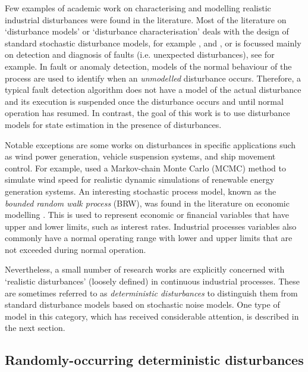 Few examples of academic work on characterising and modelling realistic industrial disturbances were found in the literature. Most of the literature on `disturbance models' or `disturbance characterisation' deals with the design of standard stochastic disturbance models, for example \cite{muske_disturbance_2002}, and \cite{pannocchia_robust_2003}, or is focussed mainly on detection and diagnosis of faults (i.e. unexpected disturbances), see \cite{thornhill_advances_2007} for example. In fault or anomaly detection, models of the normal behaviour of the process are used to identify when an \textit{unmodelled} disturbance occurs. Therefore, a typical fault detection algorithm does not have a model of the actual disturbance and its execution is suspended once the disturbance occurs and until normal operation has resumed. In contrast, the goal of this work is to use disturbance models for state estimation in the presence of disturbances.

Notable exceptions are some works on disturbances in specific applications such as wind power generation, vehicle suspension systems, and ship movement control. For example, \cite{papaefthymiou_mcmc_2008} used a Markov-chain Monte Carlo (MCMC) method to simulate wind speed for realistic dynamic simulations of renewable energy generation systems. An interesting stochastic process model, known as the \textit{bounded random walk process} (BRW), was found in the literature on economic modelling \citep{nicolau_stationary_2002}. This is used to represent economic or financial variables that have upper and lower limits, such as interest rates. Industrial processes variables also commonly have a normal operating range with lower and upper limits that are not exceeded during normal operation.

Nevertheless, a small number of research works are explicitly concerned with `realistic disturbances' (loosely defined) in continuous industrial processes. These are sometimes referred to as \textit{deterministic disturbances} to distinguish them from standard disturbance models based on stochastic noise models. One type of model in this category, which has received considerable attention, is described in the next section.

\subsection{Randomly-occurring deterministic disturbances} \label{RODDs}

